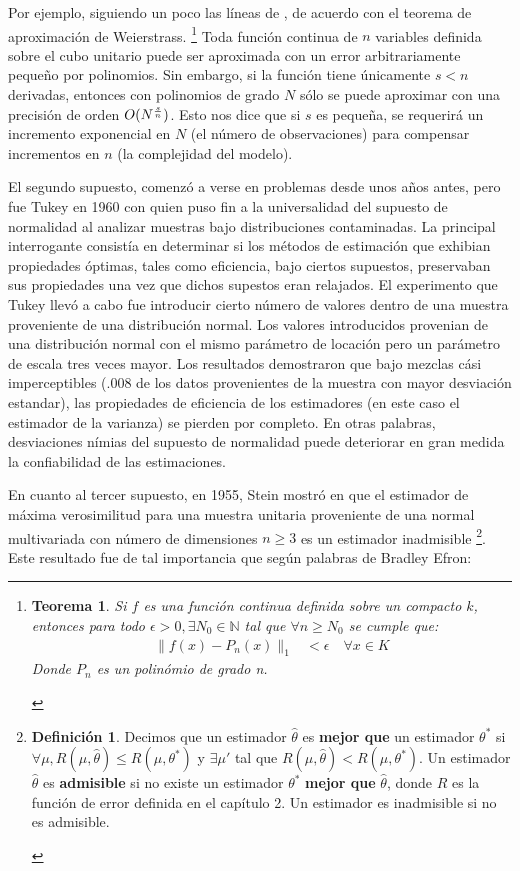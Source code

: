 \documentclass{book}
\theoremstyle{plain}
\newtheorem{thm}{Teorema}[section]
\theoremstyle{definition}
\newtheorem{defn}{Definición}[section]
\theoremstyle{remark}
\begin{document}
Por ejemplo, siguiendo un poco las líneas de \cite{VAPNIK1}, de acuerdo con el teorema de aproximación de Weierstrass. \footnote{\begin{thm}Si $f$ es una función continua definida sobre un compacto $k$, entonces para todo $\epsilon > 0, \exists N_0\in\mathbb{N}$ tal que $\forall n\geq N_0$ se cumple que:
\begin{equation*}
  \begin{split}
    \|f(x) - P_n(x)\|_1 &< \epsilon\quad\forall x\in K
  \end{split}
\end{equation*}
Donde $P_n$ es un polinómio de grado n.
\end{thm}} Toda función continua de $n$ variables definida sobre el cubo unitario puede ser aproximada con un error arbitrariamente pequeño por polinomios. Sin embargo, si la función tiene únicamente $s<n$ derivadas, entonces con polinomios de grado $N$ sólo se puede aproximar con una precisión de orden $\large{O}(N^{\frac{s}{n}})$. Esto nos dice que si $s$ es pequeña, se requerirá un incremento exponencial en $N$ (el número de observaciones) para compensar incrementos en $n$ (la complejidad del modelo).

El segundo supuesto, comenzó a verse en problemas desde unos años antes, pero fue Tukey en 1960 con\cite{TUKEY} quien puso fin a la universalidad del supuesto de normalidad al analizar muestras bajo distribuciones contaminadas. La principal interrogante consistía en determinar si los métodos de estimación que exhibian propiedades óptimas, tales como eficiencia,  bajo ciertos supuestos, preservaban sus propiedades una vez que dichos supestos eran relajados. El experimento que Tukey llevó a cabo fue introducir cierto número de valores dentro de una muestra proveniente de una distribución normal. Los valores introducidos provenian de una distribución normal con el mismo parámetro de locación pero un parámetro de escala tres veces mayor. Los resultados demostraron que bajo mezclas cási imperceptibles (.008 de los datos provenientes de la muestra con mayor desviación estandar), las propiedades de eficiencia de los estimadores (en este caso el estimador de la varianza) se pierden por completo. En otras palabras, desviaciones nímias del supuesto de normalidad puede deteriorar en gran medida la confiabilidad de las estimaciones.  

En cuanto al tercer supuesto, en 1955, Stein mostró en \cite{STEIN1} que el estimador de máxima verosimilitud para una muestra unitaria proveniente de una normal multivariada con número de dimensiones $n\geq 3$ es un estimador inadmisible \footnote{\begin{defn}Decimos que un estimador $\hat{\theta}$ es \textbf{mejor que} un estimador $\theta^*$ si $\forall\mu,R(\mu,\hat{\theta})\leq R(\mu,\theta^*)$ y $\exists\mu'$ tal que $R(\mu,\hat{\theta})<R(\mu,\theta^*)$. Un estimador $\hat{\theta}$ es \textbf{admisible} si no existe un estimador $\theta^*$ \textbf{mejor que} $\hat{\theta}$, donde $R$ es la función de error definida en el capítulo 2. Un estimador es inadmisible si no es admisible.\end{defn}}. Este resultado fue de tal importancia que según palabras de Bradley Efron:
\end{document}
